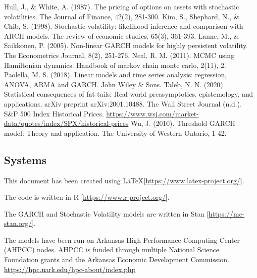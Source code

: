 \documentclass[12pt,letterpaper,reqno,fleqn]{article}
\begin{document}
\flushleft Hull, J., \& White, A. (1987). The pricing of options on assets with stochastic volatilities. The Journal of Finance, 42(2), 281-300.
\flushleft Kim, S., Shephard, N., \& Chib, S. (1998). Stochastic volatility: likelihood inference and comparison with ARCH models. The review of economic studies, 65(3), 361-393.
\flushleft Lanne, M., \& Saikkonen, P. (2005). Non‐linear GARCH models for highly persistent volatility. The Econometrics Journal, 8(2), 251-276.
\flushleft Neal, R. M. (2011). MCMC using Hamiltonian dynamics. Handbook of markov chain monte carlo, 2(11), 2.
\flushleft Paolella, M. S. (2018). Linear models and time series analysis: regression, ANOVA, ARMA and GARCH. John Wiley \& Sons.
\flushleft Taleb, N. N. (2020). Statistical consequences of fat tails: Real world preasymptotics, epistemology, and applications. arXiv preprint arXiv:2001.10488.
\flushleft The Wall Street Journal (n.d.). S\&P 500 Index Historical Prices. \href{https://www.wsj.com/market-data/quotes/index/SPX/historical-prices}{https://www.wsj.com/market-data/quotes/index/SPX/historical-prices}
\flushleft Wu, J. (2010). Threshold GARCH model: Theory and application. The University of Western Ontario, 1-42.

\subsection*{Systems}

\flushleft This document has been created using \LaTeX   [\href{https://www.latex-project.org/}{https://www.latex-project.org/}]. 

The code is written in R [\href{https://www.r-project.org/}{https://www.r-project.org/}].

The GARCH and Stochastic Volatility models are written in Stan [\href{https://mc-stan.org/}{https://mc-stan.org/}].

The models have been run on Arkansas High Performance Computing Center (AHPCC) nodes. AHPCC is funded through multiple National Science Foundation grants and the Arkansas Economic Development Commission. \href{https://hpc.uark.edu/hpc-about/index.php}{https://hpc.uark.edu/hpc-about/index.php}
\end{document}
